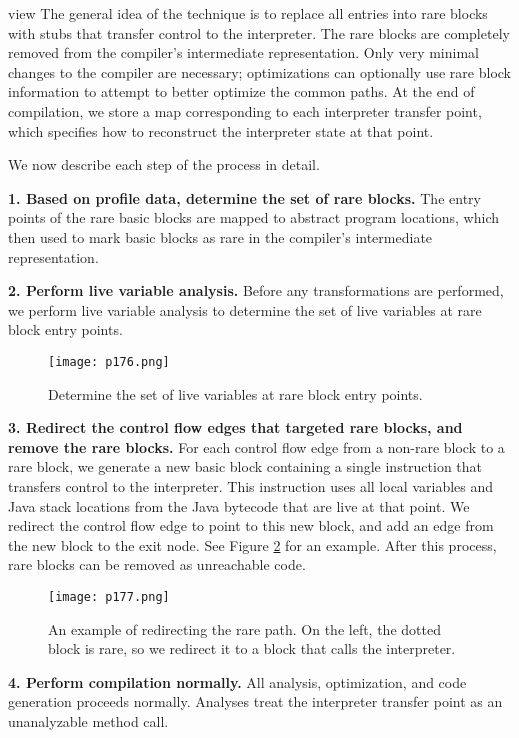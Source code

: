view
The general idea of the technique is to replace all entries
into rare blocks with stubs that transfer control to the interpreter. The rare blocks are completely removed from the
compiler’s intermediate representation. Only very minimal
changes to the compiler are necessary; optimizations can
optionally use rare block information to attempt to better
optimize the common paths. At the end of compilation, we
store a map corresponding to each interpreter transfer point,
which specifies how to reconstruct the interpreter state at
that point.


We now describe each step of the process in detail.


\textbf{1. Based on profile data, determine the set of rare
blocks.}
The entry points of the rare basic blocks
are mapped to abstract program locations, which then used to mark basic blocks as rare in the compiler’s
intermediate representation.

\textbf{2. Perform live variable analysis.}
Before any transformations are performed, we perform
live variable analysis to determine the set of live variables at rare block entry points.

\begin{figure}[H]
	\centering
	\texttt{[image: p176.png]}
	\caption{Determine the set of live variables at rare block entry points.}
	\label{fig:p176}
\end{figure}

\textbf{3. Redirect the control flow edges that targeted
rare blocks, and remove the rare blocks.}
For each control flow edge from a non-rare block to a
rare block, we generate a new basic block containing
a single instruction that transfers control to the interpreter. This instruction uses all local variables and
Java stack locations from the Java bytecode that are
live at that point. We redirect the control flow edge
to point to this new block, and add an edge from the
new block to the exit node. See Figure \ref{fig:p177} for an example. After this process, rare blocks can be removed
as unreachable code.


\begin{figure}[H]
	\centering
	\texttt{[image: p177.png]}
	\caption{An example of redirecting the rare path.
    On the left, the dotted block is rare, so we redirect
    it to a block that calls the interpreter.}
	\label{fig:p177}
\end{figure}

\textbf{4. Perform compilation normally.}
All analysis, optimization, and code generation proceeds normally. Analyses treat the interpreter transfer
point as an unanalyzable method call. 

